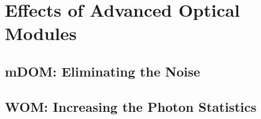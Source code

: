 \section{Effects of Advanced Optical Modules}
\label{sec:om_effects}


\subsection{mDOM: Eliminating the Noise}
\label{sec:mdom_effect}


\subsection{WOM: Increasing the Photon Statistics}
\label{sec:wom_effect}


